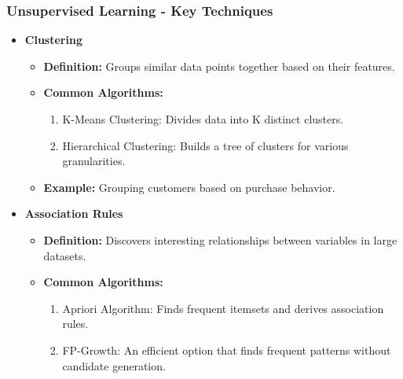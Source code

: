 \documentclass[aspectratio=169]{beamer}
\begin{document}
\begin{frame}[fragile]
    \frametitle{Unsupervised Learning - Key Techniques}
    \begin{itemize}
        \item \textbf{Clustering}
        \begin{itemize}
            \item \textbf{Definition:} Groups similar data points together based on their features.
            \item \textbf{Common Algorithms:}
            \begin{enumerate}
                \item K-Means Clustering: Divides data into K distinct clusters.
                \item Hierarchical Clustering: Builds a tree of clusters for various granularities.
            \end{enumerate}
            \item \textbf{Example:} Grouping customers based on purchase behavior.
        \end{itemize}
        
        \item \textbf{Association Rules}
        \begin{itemize}
            \item \textbf{Definition:} Discovers interesting relationships between variables in large datasets.
            \item \textbf{Common Algorithms:}
            \begin{enumerate}
                \item Apriori Algorithm: Finds frequent itemsets and derives association rules.
                \item FP-Growth: An efficient option that finds frequent patterns without candidate generation.
            \end{enumerate}
        \end{itemize}
    \end{itemize}
\end{frame}
\end{document}
